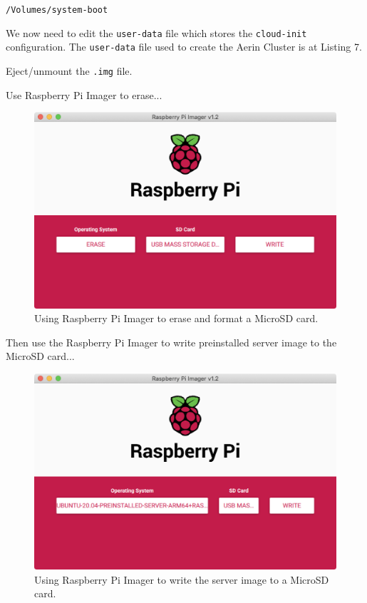 \documentclass{report}
\begin{document}
\verb|/Volumes/system-boot|

We now need to edit the \verb|user-data| file which stores the \verb|cloud-init| configuration. The \verb|user-data| file used to create the Aerin Cluster is at Listing 7.


\lstset{style=listingstyle}



Eject/unmount the \verb|.img| file.

Use Raspberry Pi Imager to erase...

\begin{figure}
	\centering	
	\includegraphics[width=1.0\textwidth]{screenshots/imager-erase.png}
	\caption{Using Raspberry Pi Imager to erase and format a MicroSD card.}
\end{figure}

Then use the Raspberry Pi Imager to write preinstalled server image to the MicroSD card...

\begin{figure}
	\centering	
	\includegraphics[width=1.0\textwidth]{screenshots/imager-write.png}
	\caption{Using Raspberry Pi Imager to write the server image to a MicroSD card.}
\end{figure}
\end{document}
